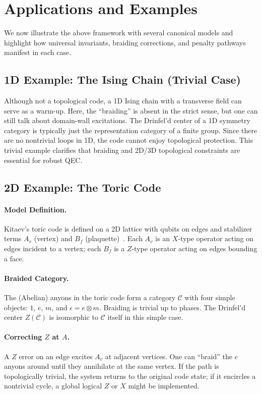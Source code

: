 \documentclass[12pt]{article}
\begin{document}
\section{Applications and Examples}\label{sec:applications_examples}
We now illustrate the above framework with several canonical models and highlight how universal invariants, braiding corrections, and penalty pathways manifest in each case.

\subsection{1D Example: The Ising Chain (Trivial Case)}
Although not a topological code, a 1D Ising chain with a transverse field can serve as a warm-up. Here, the “braiding” is absent in the strict sense, but one can still talk about domain-wall excitations. The Drinfel’d center of a 1D symmetry category is typically just the representation category of a finite group. Since there are no nontrivial loops in 1D, the code cannot enjoy topological protection. This trivial example clarifies that braiding and 2D/3D topological constraints are essential for robust QEC.

\subsection{2D Example: The Toric Code}
\paragraph{Model Definition.} Kitaev’s toric code is defined on a 2D lattice with qubits on edges and stabilizer terms $A_v$ (vertex) and $B_f$ (plaquette)~\cite{kitaev2003fault}. Each $A_v$ is an $X$-type operator acting on edges incident to a vertex; each $B_f$ is a $Z$-type operator acting on edges bounding a face. 
\paragraph{Braided Category.} The (Abelian) anyons in the toric code form a category $\mathcal{C}$ with four simple objects: $1$, $e$, $m$, and $\epsilon = e\otimes m$. Braiding is trivial up to phases. The Drinfel’d center $Z(\mathcal{C})$ is isomorphic to $\mathcal{C}$ itself in this simple case.
\paragraph{Correcting $Z$ at $A$.} A $Z$ error on an edge excites $A_v$ at adjacent vertices. One can “braid” the $e$ anyons around until they annihilate at the same vertex. If the path is topologically trivial, the system returns to the original code state; if it encircles a nontrivial cycle, a global logical $Z$ or $X$ might be implemented.
\end{document}

